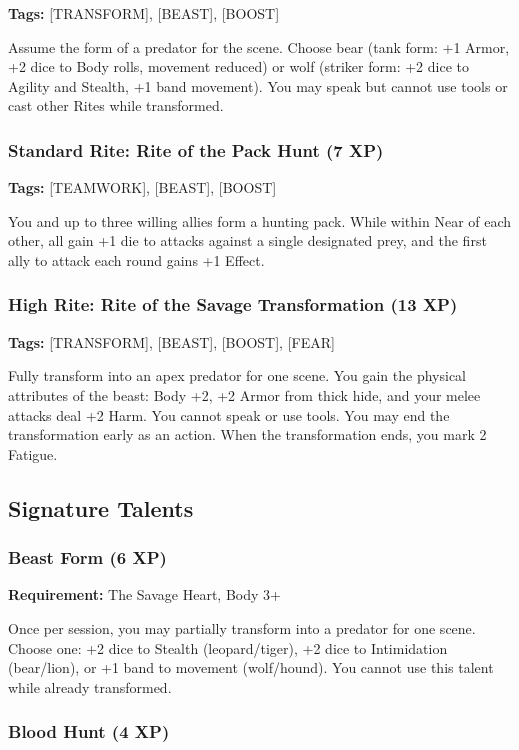 \textbf{Tags:} [TRANSFORM], [BEAST], [BOOST]

Assume the form of a predator for the scene. Choose bear (tank form: +1 Armor, +2 dice to Body rolls, movement reduced) or wolf (striker form: +2 dice to Agility and Stealth, +1 band movement). You may speak but cannot use tools or cast other Rites while transformed.

\subsubsection{Standard Rite: Rite of the Pack Hunt (7 XP)}

\textbf{Tags:} [TEAMWORK], [BEAST], [BOOST]

You and up to three willing allies form a hunting pack. While within Near of each other, all gain +1 die to attacks against a single designated prey, and the first ally to attack each round gains +1 Effect.

\subsubsection{High Rite: Rite of the Savage Transformation (13 XP)}

\textbf{Tags:} [TRANSFORM], [BEAST], [BOOST], [FEAR]

Fully transform into an apex predator for one scene. You gain the physical attributes of the beast: Body +2, +2 Armor from thick hide, and your melee attacks deal +2 Harm. You cannot speak or use tools. You may end the transformation early as an action. When the transformation ends, you mark 2 Fatigue.

\subsection{Signature Talents}

\subsubsection{Beast Form (6 XP)}

\textbf{Requirement:} The Savage Heart, Body 3+

Once per session, you may partially transform into a predator for one scene. Choose one: +2 dice to Stealth (leopard/tiger), +2 dice to Intimidation (bear/lion), or +1 band to movement (wolf/hound). You cannot use this talent while already transformed.

\subsubsection{Blood Hunt (4 XP)}

